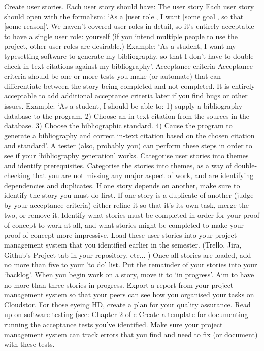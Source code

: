 \documentclass{article}
\begin{document}
Create user stories. Each user story should have:
The user story 
Each user story should open with the formalism: ‘As a [user role], I want [some goal], so that [some reason]’.
We haven’t covered user roles in detail, so it’s entirely acceptable to have a single user role: yourself (if you intend multiple people to use the project, other user roles are desirable.)
Example: ‘As a student, I want my typesetting software to generate my bibliography, so that I don’t have to double check in text citations against my bibliography’.
Acceptance criteria
Acceptance criteria should be one or more tests you make (or automate) that can differentiate between the story being completed and not completed.
It is entirely acceptable to add additional acceptance criteria later if you find bugs or other issues.
Example: ‘As a student, I should be able to: 1) supply a bibliography database to the program. 2) Choose an in-text citation from the sources in the database. 3) Choose the bibliographic standard. 4) Cause the program to generate a bibliography and correct in-text citation based on the chosen citation and standard’. A tester (also, probably you) can perform these steps in order to see if your ‘bibliography generation’ works.
Categorise user stories into themes and identify prerequisites.
Categorise the stories into themes, as a way of double-checking that you are not missing any major aspect of work, and are identifying dependencies and duplicates.
If one story depends on another, make sure to identify the story you must do first. 
If one story is a duplicate of another (judge by your acceptance criteria) either refine it so that it’s its own task, merge the two, or remove it.
Identify what stories must be completed in order for your proof of concept to work at all, and what stories might be completed to make your proof of concept more impressive.
Load these user stories into your project management system that you identified earlier in the semester. (Trello, Jira, Github’s Project tab in your repository, etc... ) 
Once all stories are loaded, add no more than five to your ’to do’ list. 
Put the remainder of your stories into your ‘backlog’.
When you begin work on a story, move it to ‘in progress’. Aim to have no more than three stories in progress.
Export a report from your project management system so that your peers can see how you organised your tasks on Cloudstor. 
For those eyeing HD, create a plan for your quality assurance. Read up on software testing (see: Chapter 2 of  c
Create a template for documenting running the acceptance tests you’ve identified. 
Make sure your project management system can track errors that you find and need to fix (or document) with these tests.
\end{document}
